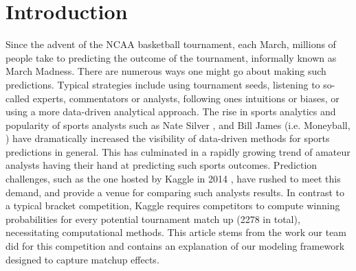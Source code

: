 \documentclass[letterpaper,12pt]{article}
\begin{document}
\section{Introduction}
Since the advent of the NCAA basketball tournament, each March, millions of people take to predicting the outcome of the tournament, informally known as March Madness. There are numerous ways one might go about making such predictions. Typical strategies include using tournament seeds, listening to so-called experts, commentators or analysts, following ones intuitions or biases, or using a more data-driven analytical approach. 
The rise in sports analytics and  popularity of sports analysts such as Nate Silver \citep{silver}, and Bill James (i.e. Moneyball, \citep{james, moneyball}) have dramatically increased the visibility of data-driven methods for sports predictions in general. This has culminated in a rapidly growing trend of amateur analysts having their hand at predicting such sports outcomes. 
Prediction challenges, such as the one hosted by Kaggle in 2014 \citep{kaggle}, have rushed to meet this demand, and provide a venue for comparing such analysts results. 
In contrast to a typical bracket competition, Kaggle requires competitors to compute winning probabilities for every potential tournament match up (2278 in total), necessitating computational methods. This article stems from the work our team did for this competition and contains an explanation of our modeling framework designed to capture matchup effects. 
\end{document}
